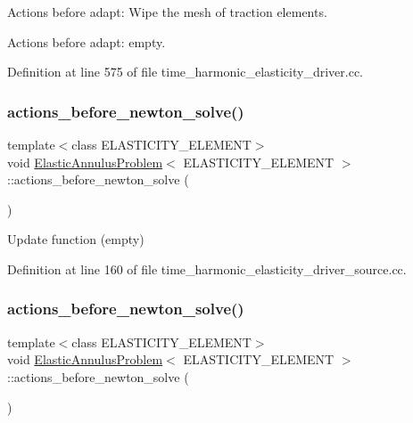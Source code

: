 Actions before adapt\+: Wipe the mesh of traction elements. 

Actions before adapt\+: empty. 

Definition at line 575 of file time\+\_\+harmonic\+\_\+elasticity\+\_\+driver.\+cc.

\mbox{\label{classElasticAnnulusProblem_af50a0dc2601e1a5e884166941d2cb9ce}} 
\subsubsection{\texorpdfstring{actions\+\_\+before\+\_\+newton\+\_\+solve()}{actions\_before\_newton\_solve()}\hspace{0.1cm}{\footnotesize\ttfamily [1/2]}}
{\footnotesize\ttfamily template$<$class E\+L\+A\+S\+T\+I\+C\+I\+T\+Y\+\_\+\+E\+L\+E\+M\+E\+NT$>$ \\
void \hyperlink{classElasticAnnulusProblem}{Elastic\+Annulus\+Problem}$<$ E\+L\+A\+S\+T\+I\+C\+I\+T\+Y\+\_\+\+E\+L\+E\+M\+E\+NT $>$\+::actions\+\_\+before\+\_\+newton\+\_\+solve (\begin{DoxyParamCaption}{ }\end{DoxyParamCaption})\hspace{0.3cm}{\ttfamily [inline]}}



Update function (empty) 



Definition at line 160 of file time\+\_\+harmonic\+\_\+elasticity\+\_\+driver\+\_\+source.\+cc.

\mbox{\label{classElasticAnnulusProblem_af50a0dc2601e1a5e884166941d2cb9ce}} 
\subsubsection{\texorpdfstring{actions\+\_\+before\+\_\+newton\+\_\+solve()}{actions\_before\_newton\_solve()}\hspace{0.1cm}{\footnotesize\ttfamily [2/2]}}
{\footnotesize\ttfamily template$<$class E\+L\+A\+S\+T\+I\+C\+I\+T\+Y\+\_\+\+E\+L\+E\+M\+E\+NT$>$ \\
void \hyperlink{classElasticAnnulusProblem}{Elastic\+Annulus\+Problem}$<$ E\+L\+A\+S\+T\+I\+C\+I\+T\+Y\+\_\+\+E\+L\+E\+M\+E\+NT $>$\+::actions\+\_\+before\+\_\+newton\+\_\+solve (\begin{DoxyParamCaption}{ }\end{DoxyParamCaption})\hspace{0.3cm}{\ttfamily [inline]}}




